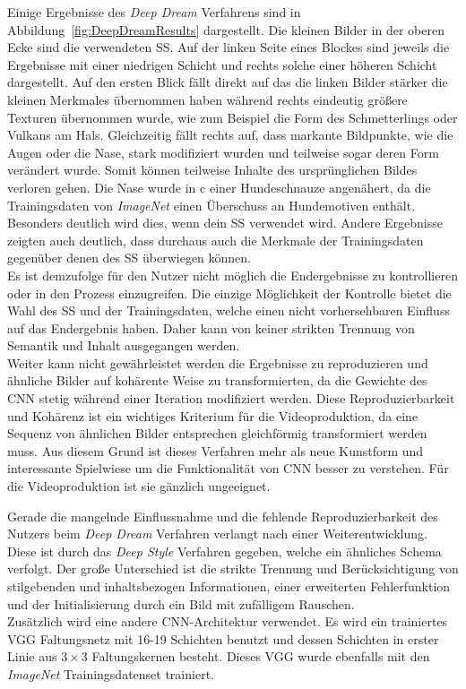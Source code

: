 \documentclass[times, 11pt,twocolumn]{article}
\begin{document}
Einige Ergebnisse des \textit{Deep Dream} Verfahrens sind in Abbildung~\ref{fig:DeepDreamResults} dargestellt. Die kleinen Bilder in der oberen Ecke sind die verwendeten SS. Auf der linken Seite eines Blockes sind jeweils die Ergebnisse mit einer niedrigen Schicht und rechts solche einer höheren Schicht dargestellt. Auf den ersten Blick fällt direkt auf das die linken Bilder stärker die kleinen Merkmales übernommen haben während rechts eindeutig größere Texturen übernommen wurde, wie zum Beispiel die Form des Schmetterlings oder Vulkans am Hals. Gleichzeitig fällt rechts auf, dass markante Bildpunkte, wie die Augen oder die Nase, stark modifiziert wurden und teilweise sogar deren Form verändert wurde. Somit können teilweise Inhalte des ursprünglichen Bildes verloren gehen. Die Nase wurde in c einer Hundeschnauze angenähert, da die Trainingsdaten von \textit{ImageNet} einen Überschuss an Hundemotiven enthält. Besonders deutlich wird dies, wenn dein SS verwendet wird\cite{McCaigDG16}. Andere Ergebnisse zeigten auch deutlich, dass durchaus auch die Merkmale der Trainingsdaten gegenüber denen des SS überwiegen können.
\\
Es ist demzufolge für den Nutzer nicht möglich die Endergebnisse zu kontrollieren oder in den Prozess einzugreifen. Die einzige Möglichkeit der Kontrolle bietet die Wahl des SS und der Trainingsdaten, welche einen nicht vorhersehbaren Einfluss auf das Endergebnis haben. Daher kann von keiner strikten Trennung von Semantik und Inhalt ausgegangen werden. \\
Weiter kann nicht gewährleistet werden die Ergebnisse zu reproduzieren und ähnliche Bilder auf kohärente  Weise zu transformierten, da die Gewichte des CNN stetig während einer Iteration modifiziert werden. Diese Reproduzierbarkeit und Kohärenz ist ein wichtiges Kriterium für die Videoproduktion, da eine Sequenz von ähnlichen Bilder entsprechen gleichförmig transformiert werden muss. Aus diesem Grund ist dieses Verfahren mehr als neue Kunstform und interessante Spielwiese um die Funktionalität von CNN besser zu verstehen. Für die Videoproduktion ist sie gänzlich ungeeignet.



\label{sec:DeepStyle}
Gerade die mangelnde Einflussnahme und die fehlende Reproduzierbarkeit des Nutzers beim \textit{Deep Dream} Verfahren \cite{DeepDream} verlangt nach einer Weiterentwicklung. Diese ist durch das \textit{Deep Style} Verfahren \cite{GatysEB15a} gegeben, welche ein ähnliches Schema verfolgt. Der große Unterschied ist die strikte Trennung und Berücksichtigung von stilgebenden und inhaltsbezogen Informationen, einer erweiterten Fehlerfunktion und der Initialisierung durch ein Bild mit zufälligem Rauschen.\\
Zusätzlich wird eine andere CNN-Architektur verwendet. Es wird ein trainiertes VGG Faltungsnetz \cite{SimonyanZ14a} mit 16-19 Schichten benutzt und dessen Schichten in erster Linie aus $3\times3$ Faltungskernen besteht. Dieses VGG wurde ebenfalls mit den \textit{ImageNet} Trainingsdatenset trainiert.\\
\end{document}
